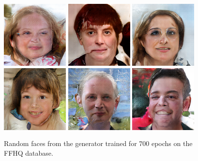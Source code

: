 \begin{figure}[!h]
{    }
    \vspace{0.1cm}
    \centerline{
        \includegraphics[scale=0.485]{figures/ffhq/random/ffhq128x128_image0039.png}
        \includegraphics[scale=0.485]{figures/ffhq/random/ffhq128x128_image0040.png}
        \includegraphics[scale=0.485]{figures/ffhq/random/ffhq128x128_image0041.png}
        \includegraphics[scale=0.485]{figures/ffhq/random/ffhq128x128_image0042.png}
        \includegraphics[scale=0.485]{figures/ffhq/random/ffhq128x128_image0043.png}
        \includegraphics[scale=0.485]{figures/ffhq/random/ffhq128x128_image0044.png}
    }
    \caption{\label{fig:appendix-ffhq-random}Random faces from the generator trained for 700 epochs on the FFHQ database.}
\end{figure}

